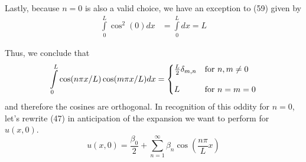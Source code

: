 \documentclass[a4paper, 11pt]{article}
\newenvironment{solution}{%
	\begin{list}{}{%
			\setlength{\topsep}{0pt}%
			\setlength{\leftmargin}{0.5cm}%
			\setlength{\rightmargin}{0.5cm}%
			\setlength{\listparindent}{\parindent}%
			\setlength{\itemindent}{\parindent}%
			\setlength{\parsep}{\parskip}%
		}%
		\item[]}{\end{list}}
\begin{document}
\begin{enumerate}[leftmargin=0em]
\begin{solution}
        Lastly, because $n=0$ is also a valid choice, we have an exception to
        (59) given by
        \begin{align}
          \int\limits_0^L \cos^2(0)dx &= \int\limits_0^L dx = L
        \end{align}
        
        Thus, we conclude that
        \begin{equation}
          \int\limits_0^L \cos(n\pi x/L)\cos(m\pi x/L)dx =  
          \begin{cases}
            \frac{L}{2}\delta_{m,n} &\text{for } n,m\neq 0\vspace{1em}\\
            L &\text{for } n=m=0
          \end{cases}
        \end{equation}
        and therefore the cosines are orthogonal. In recognition of this oddity
        for $n=0$, let's rewrite (47) in anticipation of the expansion we want
        to perform for $u(x,0)$.
        \begin{equation}
          u(x,0) = \frac{\beta_0}{2} +\sum\limits_{n=1}^\infty\beta_n \cos\left( \frac{n\pi}{L}x \right)
        \end{equation}


\end{solution}
\end{enumerate}
\end{document}

